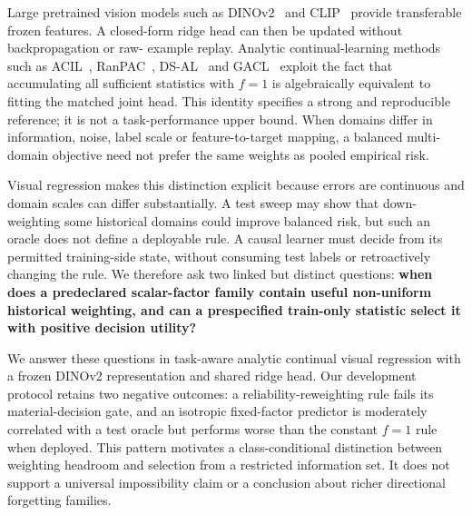 \documentclass[10pt]{article}
\begin{document}
Large pretrained vision models such as DINOv2~\citep{oquab2023dinov2} and
CLIP~\citep{radford2021learning} provide transferable frozen features.  A
closed-form ridge head can then be updated without backpropagation or raw-
example replay.  Analytic continual-learning methods such as
ACIL~\citep{zhuang2022acil}, RanPAC~\citep{mcdonnell2023ranpac},
DS-AL~\citep{yang2024dsal} and GACL~\citep{gao2024gacl} exploit the fact that
accumulating all sufficient statistics with $f=1$ is algebraically equivalent
to fitting the matched joint head.  This identity specifies a strong and
reproducible reference; it is not a task-performance upper bound.  When
domains differ in information, noise, label scale or feature-to-target
mapping, a balanced multi-domain objective need not prefer the same weights
as pooled empirical risk.

Visual regression makes this distinction explicit because errors are
continuous and domain scales can differ substantially.  A test sweep may show
that down-weighting some historical domains could improve balanced risk, but
such an oracle does not define a deployable rule.  A causal learner must decide
from its permitted training-side state, without consuming test labels or
retroactively changing the rule.  We therefore ask two linked but distinct
questions: \textbf{when does a predeclared scalar-factor family contain useful
non-uniform historical weighting, and can a prespecified train-only statistic
select it with positive decision utility?}

We answer these questions in task-aware analytic continual visual regression
with a frozen DINOv2 representation and shared ridge head.  Our development
protocol retains two negative outcomes: a reliability-reweighting rule fails
its material-decision gate, and an isotropic fixed-factor predictor is
moderately correlated with a test oracle but performs worse than the constant
$f=1$ rule when deployed. This pattern motivates a class-conditional
distinction between weighting headroom and selection from a restricted
information set. It does not support a universal impossibility claim or a
conclusion about richer directional forgetting families.
\end{document}
